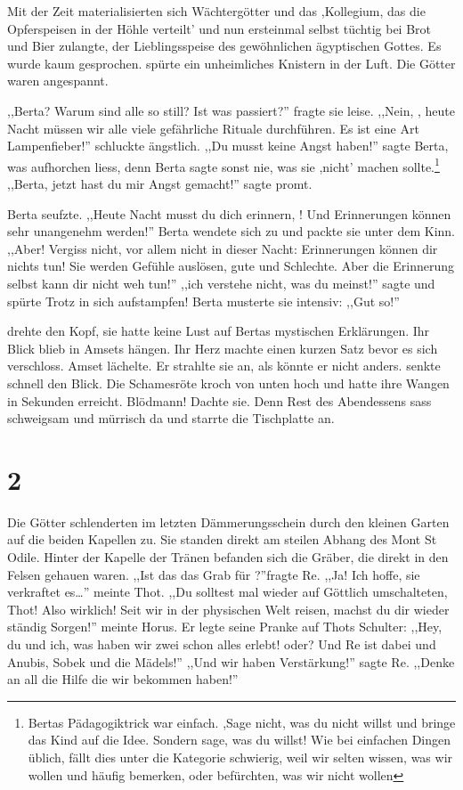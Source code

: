 Mit der Zeit materialisierten sich Wächtergötter und das ,Kollegium, das die Opferspeisen in der Höhle verteilt' und nun ersteinmal selbst tüchtig bei Brot und Bier zulangte, der Lieblingsspeise des gewöhnlichen ägyptischen Gottes. Es wurde kaum gesprochen. \am spürte ein unheimliches Knistern in der Luft. Die Götter waren angespannt. 

,,Berta? Warum sind alle so still? Ist was passiert?'' fragte sie leise. ,,Nein, \am , heute Nacht müssen wir alle viele gefährliche Rituale durchführen. Es ist eine Art Lampenfieber!'' \am schluckte ängstlich. ,,Du musst keine Angst haben!'' sagte Berta, was \am aufhorchen liess, denn Berta sagte sonst nie, was sie ,nicht' machen sollte.\footnote{Bertas Pädagogiktrick war einfach. ,Sage nicht, was du nicht willst und bringe das Kind auf die Idee. Sondern sage, was du willst! Wie bei einfachen Dingen üblich, fällt dies unter die Kategorie schwierig, weil wir selten wissen, was wir wollen und häufig bemerken, oder befürchten, was wir nicht wollen} ,,Berta, jetzt hast du mir Angst gemacht!'' sagte \am promt.

Berta seufzte. ,,Heute Nacht musst du dich erinnern, \am ! Und Erinnerungen können sehr unangenehm werden!'' Berta wendete sich \am zu und packte sie unter dem Kinn. ,,Aber! Vergiss nicht, vor allem nicht in dieser Nacht: Erinnerungen können dir nichts tun! Sie werden Gefühle auslösen, gute und Schlechte. Aber die Erinnerung selbst kann dir nicht weh tun!'' ,,ich verstehe nicht, was du meinst!'' sagte \am und spürte Trotz in sich aufstampfen! Berta musterte sie intensiv: ,,Gut so!''

\am drehte den Kopf, sie hatte keine Lust auf Bertas mystischen Erklärungen. Ihr Blick blieb in Amsets hängen. Ihr Herz machte einen kurzen Satz bevor es sich verschloss. Amset lächelte. Er strahlte sie an, als könnte er nicht anders. \am senkte schnell den Blick. Die Schamesröte kroch von unten hoch und hatte ihre Wangen in Sekunden erreicht. Blödmann! Dachte sie. Denn Rest des Abendessens sass \am schweigsam und mürrisch da und starrte die Tischplatte an.

\section*{2}

Die Götter schlenderten im letzten Dämmerungsschein durch den kleinen Garten auf die beiden Kapellen zu. Sie standen direkt am steilen Abhang des Mont St Odile. Hinter der Kapelle der Tränen befanden sich die Gräber, die direkt in den Felsen gehauen waren. ,,Ist das das Grab für \am ?''fragte Re. ,,Ja! Ich hoffe, sie verkraftet es\dots '' meinte Thot. ,,Du solltest mal wieder auf Göttlich umschalteten, Thot! Also wirklich! Seit wir in der physischen Welt reisen, machst du dir wieder ständig Sorgen!'' meinte Horus. Er legte seine Pranke auf Thots Schulter: ,,Hey, du und ich, was haben wir zwei schon alles erlebt! oder? Und Re ist dabei und Anubis, Sobek und die Mädels!'' ,,Und wir haben Verstärkung!'' sagte Re. ,,Denke an all die Hilfe die wir bekommen haben!''

